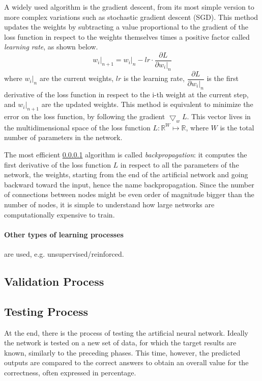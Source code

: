 A widely used algorithm is the gradient descent, from its most simple version to more complex variations such as stochastic gradient descent (SGD).
This method updates the weights by subtracting a value proportional to the gradient of the loss function in respect to the weights themselves times a positive factor called \textit{learning rate}, as shown below.
\begin{equation}
	\left.w_i\right|_{n+1} = \left.w_i\right|_n - lr \cdot \frac{\partial L}{\partial \left.w_i\right|_n}
\end{equation}
where $\left.w_i\right|_{n}$ are the current weights, $lr$ is the learning rate, $\dfrac{\partial L}{\partial \left.w_i\right|_n}$ is the first derivative of the loss function in respect to the i-th weight at the current step, and $\left.w_i\right|_{n+1}$ are the updated weights.
This method is equivalent to minimize the error on the loss function, by following the gradient $\bigtriangledown_w L$.
This vector lives in the multidimensional space of the loss function $L:\mathbb{R}^W \mapsto \mathbb{R}$, where $W$ is the total number of parameters in the network.

The most efficient \ref{} algorithm is called \textit{backpropagation}: it computes the first derivative of the loss function $L$ in respect to all the parameters of the network, the weights, starting from the end of the artificial network and going backward toward the input, hence the name backpropagation.
Since the number of connections between nodes might be even order of magnitude bigger than the number of nodes, it is simple to understand how large networks are computationally expensive to train.

\paragraph{Other types of learning processes} are used, e.g. unsupervised/reinforced.

\subsection{Validation Process}
\label{ssec:Validation_Process}

\subsection{Testing Process}
\label{ssec:Testing_Process}
At the end, there is the process of testing the artificial neural network.
Ideally the network is tested on a new set of data, for which the target results are known, similarly to the preceding phases.
This time, however, the predicted outputs are compared to the correct answers to obtain an overall value for the correctness, often expressed in percentage.

